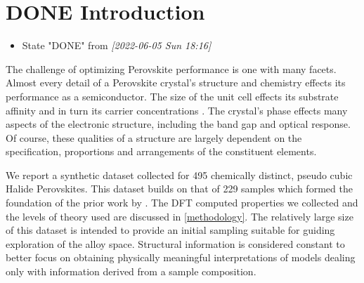\documentclass[twoside, twocolumn, 9pt, draft]{article}
\begin{document}
\renewcommand*\rmdefault{bch}\normalfont\upshape
\rmfamily
\section*{}
\vspace{-1cm}



\section*{{\bfseries\sffamily DONE} Introduction}
\label{sec:org7e3fe03}
\begin{itemize}
\item State "DONE"       from              \textit{[2022-06-05 Sun 18:16]}
\end{itemize}
The challenge of optimizing Perovskite performance is one with many
facets. Almost every detail of a Perovskite crystal's structure and
chemistry effects its performance as a semiconductor. The size of the
unit cell effects its substrate affinity and in turn its carrier
concentrations \cite{jiang-2006-predic-lattic}. The crystal's phase
effects many aspects of the electronic structure, including the band
gap and optical response. Of course, these qualities of a structure
are largely dependent on the specification, proportions and
arrangements of the constituent elements.

We report a synthetic dataset collected for 495 chemically distinct,
pseudo cubic Halide Perovskites. This dataset builds on that of 229
samples which formed the foundation of the prior work by
\citet{mannodi-kanakkithodi-2021-data-driven-new}. The DFT computed
properties we collected and the levels of theory used are discussed in
\ref{methodology}. The relatively large size of this dataset is intended
to provide an initial sampling suitable for guiding exploration of the
alloy space. Structural information is considered constant to better
focus on obtaining physically meaningful interpretations of models
dealing only with information derived from a sample composition.
\end{document}
